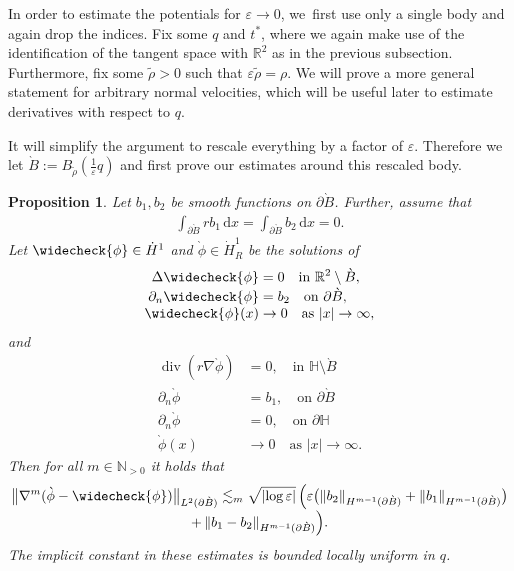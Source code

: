 \documentclass[JEP,XML,SOM,Unicode,published]{cedram}
\let\epsilon\varepsilon
\let\backslash\setminus
\newtheorem{proposition}[theorem]{Proposition}
\theoremstyle{definition}
\renewcommand{\div}{\operatorname{div}}
\newcommand\R{\mathbb{R}}
\newcommand\N{\mathbb{N}}
\newcommand\norm[1]{\left\lVert #1\right\rVert}
\newcommand\anorm[1]{\lVert #1\rVert}
\newcommand\bnorm[1]{\bigl\lVert #1\bigr\rVert}
\newcommand\eq{=}
\newcommand\dd{\,\mathrm{d}}
\newcommand\dx{\dd x}
\let\chek\widecheck
\let\de\partial
\let\eps\epsilon
\begin{document}
In order to estimate the potentials for $\eps\to 0$, we~first use only a single body and again drop the indices.
Fix some $q$ and $t^*$, where we again make use of the identification of the tangent space with $\R^2$ as in the previous subsection. Furthermore, fix some $\tilde{\rho}>0$ such that $\eps\tilde{\rho}=\rho$.
We will prove a more general statement for arbitrary normal velocities, which will be useful later to estimate derivatives with respect to $q$.

It will simplify the argument to rescale everything by a factor of $\eps$. Therefore we let $\grave{B}:=B_{\tilde{\rho}}(\frac{1}{\eps}q)$ and first prove our estimates around this rescaled body.

\begin{proposition}\label{PotentialGeneral}
Let $b_1,b_2$ be smooth functions on $\de \grave{B}$. Further, assume that
\begin{align*}
\int_{\de \grave{B}}rb_1\dx\eq\int_{\de \grave{B}}b_2\dx\eq0.
\end{align*}
Let $\chek{\phi}\in \dot{H}^1$ and $\grave{\phi}\in \dot{H}_R^1$ be the solutions of
\begin{align}
\Delta\chek{\phi}&\eq0\quad\text{in $\R^2\backslash \grave{B}$},\label{def chek 1}\\[-3pt]
\de_n\chek{\phi}&\eq b_2 \quad\text{on $\de \grave{B}$},\label{def chek 0}\\[-3pt]
\chek{\phi}(x)&\to 0 \quad\text{as $|x|\to\infty$},\label{def chek 2}
\end{align}
and\vspace*{-8pt}\enlargethispage{\baselineskip}
\begin{align*}
\div(r\nabla\grave{\phi})&\eq0,\quad\text{in $\mathbb{H}\backslash \grave{B}$}\\[-3pt]
\de_n\grave{\phi}&\eq b_1, \quad\text{on $\de \grave{B}$}\\[-3pt]
\de_n\grave{\phi}&\eq0, \quad\text{on $\de\mathbb{H}$}\\[-3pt]
\grave{\phi}(x)&\to 0 \quad\text{as $|x|\to\infty$}.
\end{align*}
Then for all $m\in \N_{>0}$ it holds that\vspace*{-5pt}
\begin{multline*}
\bnorm{\nabla^m(\grave{\phi}-\chek{\phi})}_{L^2(\de \grave{B})}\lesssim_m \sqrt{|{\log\eps}|}\,\Bigl(\eps\bigl(\anorm{b_2}_{H^{m-1}(\de \grave{B})}+\norm{b_1}_{H^{m-1}(\de\grave{B})}\bigr)\\[-3pt]
+\norm{b_1-b_2}_{H^{m-1}(\de\grave{B})}\Bigr).
\end{multline*}
The implicit constant in these estimates is bounded locally uniform in $q$.
\end{proposition}
\end{document}
